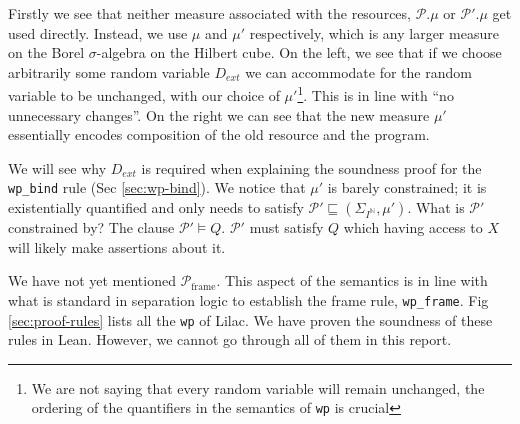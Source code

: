 Firstly we see that neither measure associated with the resources, $\mathcal{P}.\mu$ or $\mathcal{P'}.\mu$ get used directly. Instead, we use $\mu$ and $\mu'$ respectively, which is any larger measure
on the Borel $\sigma$-algebra on the Hilbert cube. On the left, we see that if we choose arbitrarily some random variable $D_{ext}$ we can accommodate for the random variable to be unchanged,
with our choice of $\mu'$\footnote{We are not saying that every random variable will remain unchanged, the ordering of the quantifiers in the semantics of \texttt{wp} is crucial}.
This is in line with ``no unnecessary changes''. On the right we can see that the new measure $\mu'$ essentially encodes composition of the old resource and the program.

We will see why $D_{ext}$ is required when explaining the soundness proof for the \texttt{wp\_bind} rule (Sec \ref{sec:wp-bind}). We notice that $\mu'$ is barely constrained; it is existentially quantified and only needs
to satisfy $\mathcal{P'} \sqsubseteq (\Sigma_{I^\mathbb{N}},\mu')$. What is $\mathcal{P'}$ constrained by? The clause $\mathcal{P'} \vDash Q$. $\mathcal{P'}$ must satisfy $Q$ which having
access to $X$ will likely make assertions about it.

We have not yet mentioned $\mathcal{P}_{\mathrm{frame}}$. This aspect of the semantics is in line with what is standard in separation logic to establish the frame rule, \texttt{wp\_frame}. Fig \ref{sec:proof-rules}
lists all the \texttt{wp} of Lilac. We have proven the soundness of these rules in Lean. However, we cannot go through all of them in this report.

